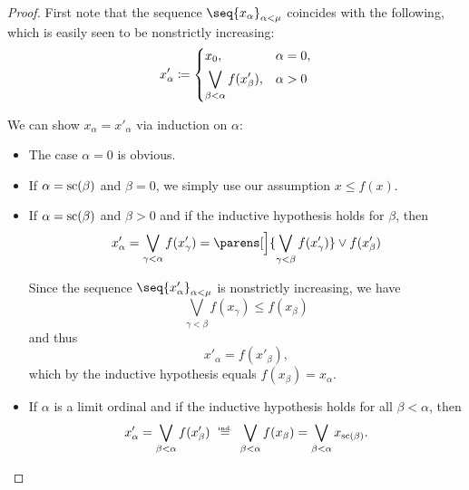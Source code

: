 \begin{proof}
   First note that the sequence \( \seq{ x_\alpha }_{\alpha < \mu} \) coincides with the following, which is easily seen to be nonstrictly increasing:
  \begin{equation*}
    x'_\alpha \coloneqq \begin{dcases}
      x_0,                                  &\alpha = 0, \\
      \bigvee_{\beta < \alpha} f(x'_\beta), &\alpha > 0 \\
    \end{dcases}
  \end{equation*}

   We can show \( x_\alpha = x'_\alpha \) via induction on \( \alpha \):
  \begin{itemize}
    \item The case \( \alpha = 0 \) is obvious.
    \item If \( \alpha = \op{sc}(\beta) \) and \( \beta = 0 \), we simply use our assumption \( x \leq f(x) \).
    \item If \( \alpha = \op{sc}(\beta) \) and \( \beta > 0 \) and if the inductive hypothesis holds for \( \beta \), then
    \begin{equation*}
      x'_\alpha
      =
      \bigvee_{\gamma < \alpha} f(x'_\gamma)
      =
      \parens[\Big]{ \bigvee_{\gamma < \beta} f(x'_\gamma) } \vee f(x'_\beta)
    \end{equation*}

    Since the sequence \( \seq{ x'_\alpha }_{\alpha < \mu} \) is nonstrictly increasing, we have
    \begin{equation*}
      \bigvee_{\gamma < \beta} f(x_\gamma) \leq f(x_\beta)
    \end{equation*}
    and thus
    \begin{equation*}
      x'_\alpha = f(x'_\beta),
    \end{equation*}
    which by the inductive hypothesis equals \( f(x_\beta) = x_\alpha \).

    \item If \( \alpha \) is a limit ordinal and if the inductive hypothesis holds for all \( \beta < \alpha \), then
    \begin{equation*}
      x'_\alpha
      =
      \bigvee_{\beta < \alpha} f(x'_\beta)
      \reloset {\T{ind.}} =
      \bigvee_{\beta < \alpha} f(x_\beta)
      =
      \bigvee_{\beta < \alpha} x_{\op{sc}(\beta)}.
    \end{equation*}


\end{itemize}
\end{proof}

